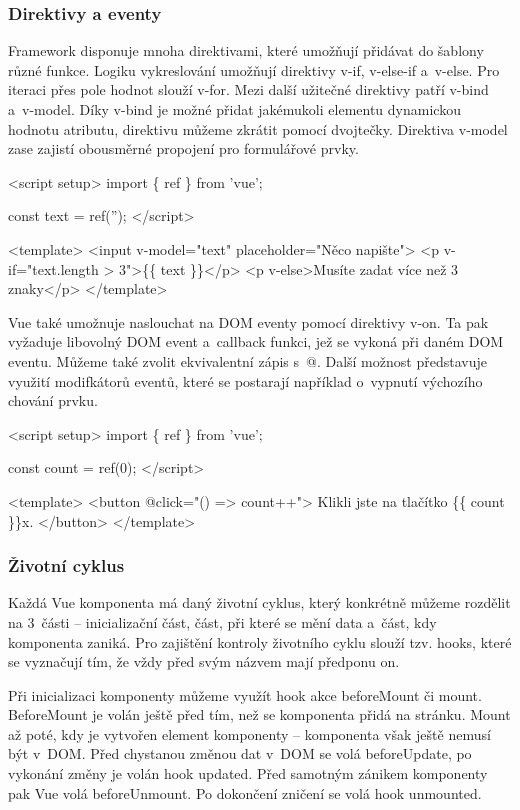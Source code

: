 \subsubsection{Direktivy a eventy}

Framework disponuje mnoha direktivami, které umožňují přidávat do šablony různé funkce. Logiku vykreslování umožňují direktivy v-if, v-else-if a~v-else. 
Pro iteraci přes pole hodnot slouží v-for. Mezi další užitečné direktivy patří v-bind a~v-model. 
Díky v-bind je možné přidat jakémukoli elementu dynamickou hodnotu atributu, direktivu můžeme zkrátit pomocí dvojtečky. 
Direktiva v-model zase zajistí obousměrné propojení pro formulářové prvky.

\begin{prog}
<script setup>
  import \{ ref \} from 'vue';

  const text = ref('');
</script>

<template>
  <input v-model="text" placeholder="Něco napište">
  <p v-if="text.length > 3">\{\{ text \}\}</p>
  <p v-else>Musíte zadat více než 3 znaky</p>
</template> 
\end{prog}

Vue také umožnuje naslouchat na DOM eventy pomocí direktivy v-on. Ta pak vyžaduje libovolný DOM event a~callback funkci, jež se vykoná při daném DOM eventu. 
Můžeme také zvolit ekvivalentní zápis s~@. Další možnost představuje využití modifkátorů eventů, které se postarají například o~vypnutí výchozího chování prvku.\cite{vuemacrae,vue}

\begin{prog}
<script setup>
  import \{ ref \} from 'vue';

  const count = ref(0);
</script>

<template>
  <button @click="() => count++">
    Klikli jste na tlačítko \{\{ count \}\}x.
  </button>
</template>
\end{prog}

\subsubsection{Životní cyklus}

Každá Vue komponenta má daný životní cyklus, který konkrétně můžeme rozdělit na 3~části -- inicializační část, část, při které se mění data a~část, kdy komponenta zaniká. 
Pro zajištění kontroly životního cyklu slouží tzv. hooks, které se vyznačují tím, že vždy před svým názvem mají předponu on.

Při inicializaci komponenty můžeme využít hook akce beforeMount či mount. BeforeMount je volán ještě před tím, než se komponenta přidá na stránku. 
Mount až poté, kdy je vytvořen element komponenty -- komponenta však ještě nemusí být v~DOM. 
Před chystanou změnou dat v~DOM se volá beforeUpdate, po vykonání změny je volán hook updated. Před samotným zánikem komponenty pak Vue volá beforeUnmount. 
Po dokončení zničení se volá hook unmounted.\cite{vuemacrae,vue}

